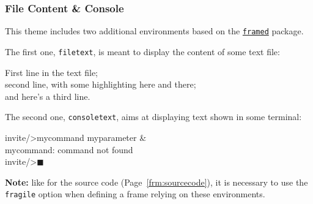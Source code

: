 \documentclass[10pt,    %
    english,            %
    xcolor=table,       %
    envcountsect,        %
    aspectratio=169     %
]{beamer}
\begin{document}
\begin{frame}[fragile]
    \frametitle{File Content \& Console}
    
    This theme includes two additional environments based on the \href{https://ctan.org/pkg/framed?lang=en}{\texttt{framed}} package.
    
    \vspace{0.25cm}
    The first one, \texttt{filetext}, is meant to display the content of some text file:
    
    \begin{filetext}
First line in the text file; \\
second line, with some highlighting \textcolor{fgRed}{here} and \colorbox{fgRed}{there}; \\
and here's a third line.
    \end{filetext}
    
    \vspace{0.25cm}
    The second one, \texttt{consoletext}, aims at displaying text shown in some terminal:
    
    \begin{consoletext}
invite/>mycommand myparameter \& \\
mycommand: command not found \\
invite/>$\blacksquare$
    \end{consoletext}
    
    \vspace{0.25cm}
    \textbf{Note:} like for the source code (Page~\ref{frm:sourcecode}), it is necessary to use the \texttt{fragile} option when defining a frame relying on these environments.
\end{frame}







\end{document}

